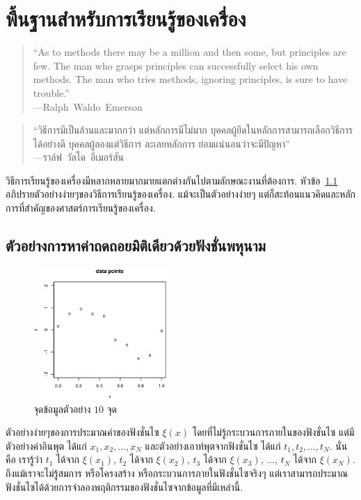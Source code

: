\chapter{พื้นฐานสำหรับการเรียนรู้ของเครื่อง}
\label{chapter: background}

\begin{verse}
``As to methods there may be a million and then some, 
but principles are few. The man who grasps principles can successfully select his own methods. The man who tries methods, ignoring principles, is sure to have trouble.'' \\
---Ralph~Waldo~Emerson
\end{verse}

\begin{verse}
``วิธีการมีเป็นล้านและมากกว่า แต่หลักการมีไม่มาก
บุคคลผู้ยึดในหลักการสามารถเลือกวิธีการได้อย่างดี
บุคคลผู้ลองแต่วิธีการ ละเลยหลักการ ย่อมแน่นอนว่าจะมีปัญหา'' \\
---ราล์ฟ~วัลโด~อีเมอร์สัน
\end{verse}


วิธีการเรียนรู้ของเครื่องมีหลากหลายมากมายแตกต่างกันไปตามลักษณะงานที่ต้องการ.
หัวข้อ~\ref{section: Polynomial Curve Fitting} อภิปรายตัวอย่างง่ายๆของวิธีการเรียนรู้ของเครื่อง.
แม้จะเป็นตัวอย่างง่ายๆ แต่ก็สะท้อนแนวคิดและหลักการที่สำคัญของศาสตร์การเรียนรู้ของเครื่อง.

\section{ตัวอย่างการหาค่าถดถอยมิติเดียวด้วยฟังชั่นพหุนาม}
\label{section: Polynomial Curve Fitting}

%
\begin{figure}
\begin{center}
\includegraphics[width=2.0in]
{02Background/bgCurveFit01.eps}
\end{center}
\caption{จุดข้อมูลตัวอย่าง $10$ จุด}
\label{fig: curve fitting 10 datapoints}
\end{figure}
%

ตัวอย่างง่ายๆของการประมาณค่าของฟังชั่นไซ $\xi(x)$ โดยที่ไม่รู้กระบวนการภายในของฟังชั่นไซ 
แต่มีตัวอย่างค่าอินพุต ได้แก่ $x_1, x_2, \ldots, x_N$ 
และตัวอย่างเอาท์พุตจากฟังชั่นไซ ได้แก่ $t_1, t_2, \ldots, t_N$.
นั่นคือ เรารู้ว่า $t_1$ ได้จาก $\xi(x_1)$, 
$t_2$ ได้จาก $\xi(x_2)$, 
$t_3$ ได้จาก $\xi(x_3)$,
$\ldots$,
$t_N$ ได้จาก $\xi(x_N)$.
%
ถึงแม้เราจะไม่รู้สมการ หรือโครงสร้าง หรือกระบวนการภายในฟังชั่นไซจริงๆ 
แต่เราสามารถประมาณฟังชั่นไซได้ด้วยการจำลองพฤติกรรมของฟังชั่นไซจากข้อมูลที่มีเหล่านี้.

